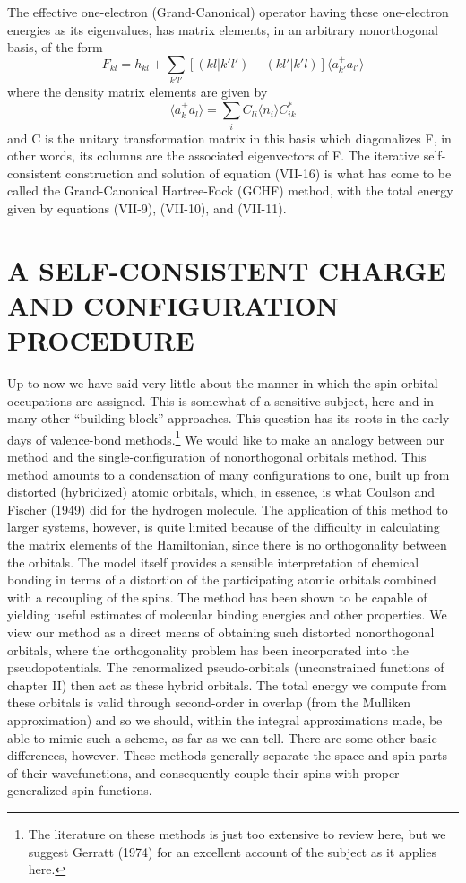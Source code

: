 \documentclass[12pt,letterpaper]{report}
\begin{document}
The effective one-electron (Grand-Canonical) operator having these one-electron energies as its eigenvalues, has matrix elements, in an arbitrary nonorthogonal basis, of the form
\begin{equation}
F_{kl} = h_{kl} + \sum_{k'l'} [(kl|k'l') - (kl'|k'l)] \langle a_{k'}^+ a_{l'} \rangle
\end{equation}
where the density matrix elements are given by
\begin{equation}
\langle a_k^+ a_l \rangle = \sum_i C_{li} \langle n_i \rangle C_{ik}^*
\end{equation}
and C is the unitary transformation matrix in this basis which diagonalizes F, in other words, its columns are the associated eigenvectors of F. The iterative self-consistent construction and solution of equation (VII-16) is what has come to be called the Grand-Canonical Hartree-Fock (GCHF) method, with the total energy given by equations (VII-9), (VII-10), and (VII-11).

\chapter{A SELF-CONSISTENT CHARGE AND CONFIGURATION PROCEDURE}

Up to now we have said very little about the manner in which the spin-orbital occupations are assigned. This is somewhat of a sensitive subject, here and in many other ``building-block'' approaches. This question has its roots in the early days of valence-bond methods.\footnote{The literature on these methods is just too extensive to review here, but we suggest Gerratt (1974) for an excellent account of the subject as it applies here.} We would like to make an analogy between our method and the single-configuration of nonorthogonal orbitals method. This method amounts to a condensation of many configurations to one, built up from distorted (hybridized) atomic orbitals, which, in essence, is what Coulson and Fischer (1949) did for the hydrogen molecule. The application of this method to larger systems, however, is quite limited because of the difficulty in calculating the matrix elements of the Hamiltonian, since there is no orthogonality between the orbitals. The model itself provides a sensible interpretation of chemical bonding in terms of a distortion of the participating atomic orbitals combined with a recoupling of the spins. The method has been shown to be capable of yielding useful estimates of molecular binding energies and other properties. We view our method as a direct means of obtaining such distorted nonorthogonal orbitals, where the orthogonality problem has been incorporated into the pseudopotentials. The renormalized pseudo-orbitals (unconstrained functions of chapter II) then act as these hybrid orbitals. The total energy we compute from these orbitals is valid through second-order in overlap (from the Mulliken approximation) and so we should, within the integral approximations made, be able to mimic such a scheme, as far as we can tell. There are some other basic differences, however. These methods generally separate the space and spin parts of their wavefunctions, and consequently couple their spins with proper generalized spin functions.
\end{document}
